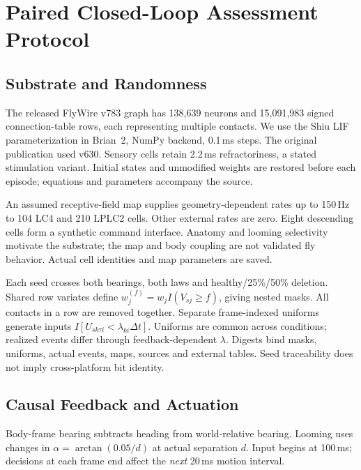 \section{Paired Closed-Loop Assessment Protocol}
\label{sec:protocol}
\subsection{Substrate and Randomness}
The released FlyWire v783 graph has 138,639 neurons and 15,091,983 signed connection-table rows, each representing multiple contacts. We use the Shiu LIF parameterization\cite{shiu2024drosophila} in Brian~2\cite{stimberg2019brian2}, NumPy backend, 0.1\,ms steps. The original publication used v630. Sensory cells retain 2.2\,ms refractoriness, a stated stimulation variant. Initial states and unmodified weights are restored before each episode; equations and parameters accompany the source.

An assumed receptive-field map supplies geometry-dependent rates up to 150\,Hz to 104 LC4 and 210 LPLC2 cells. Other external rates are zero. Eight descending cells form a synthetic command interface. Anatomy and looming selectivity\cite{klapoetke2017looming} motivate the substrate; the map and body coupling are not validated fly behavior. Actual cell identities and map parameters are saved.

Each seed crosses both bearings, both laws and healthy/25\%/50\% deletion. Shared row variates define $w_j^{(f)}=w_j I(V_{sj}\geq f)$, giving nested masks. All contacts in a row are removed together. Separate frame-indexed uniforms generate inputs $I[U_{sk\tau i}<\lambda_{ki}\Delta t]$. Uniforms are common across conditions; realized events differ through feedback-dependent $\lambda$. Digests bind masks, uniforms, actual events, maps, sources and external tables. Seed traceability does not imply cross-platform bit identity.

\subsection{Causal Feedback and Actuation}
Body-frame bearing subtracts heading from world-relative bearing. Looming uses changes in $\alpha=\arctan(0.05/d)$ at actual separation $d$. Input begins at 100\,ms; decisions at each frame end affect the \emph{next} 20\,ms motion interval.

